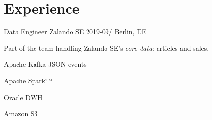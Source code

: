 \documentclass[11pt,letterpaper]{article}%
\begin{document}
\noindent%
\begin{minipage}[t]{0.575\textwidth}
  \section{Experience}%
  \label{sec:experience}
  \WorkEntry%
  {Data Engineer}%
  {\href{https://corporate.zalando.com/en}{Zalando SE}}%
  {2019-09/}%
  {Berlin, DE}%
  {%
    Part of the team handling Zalando SE’s \emph{core data}: articles and
    sales.%
    \medskip%
    \newline%
    \begin{adjustbox}{valign=m,minipage=.25\linewidth}
      \begin{tcolorbox}[title=Nakadi,remember as=Kafka,width=\linewidth]
        Apache Kafka%
        \tcblower%
        JSON events
      \end{tcolorbox}
    \end{adjustbox}%
    \hfill%
    \begin{adjustbox}{valign=m,minipage=.25\linewidth,margin=0 0 0 16pt}
      \begin{tcolorbox}[title=Databricks,remember as=Spark,width=\linewidth]
        Apache Spark™
      \end{tcolorbox}%
    \end{adjustbox}%
    \hfill%
    \begin{adjustbox}{valign=m,minipage=.2\linewidth}
      \begin{tcolorbox}[remember as=Oracle,width=\linewidth]
        Oracle DWH
      \end{tcolorbox}%
      \newline%
      \begin{tcolorbox}[remember as=S3,width=\linewidth]
        Amazon S3
      \end{tcolorbox}%
    \end{adjustbox}%
    \hfill%
    \begin{adjustbox}{valign=m,minipage=.15\linewidth,margin=0 0 0 16pt}

\end{adjustbox}}
\end{minipage}
\end{document}
